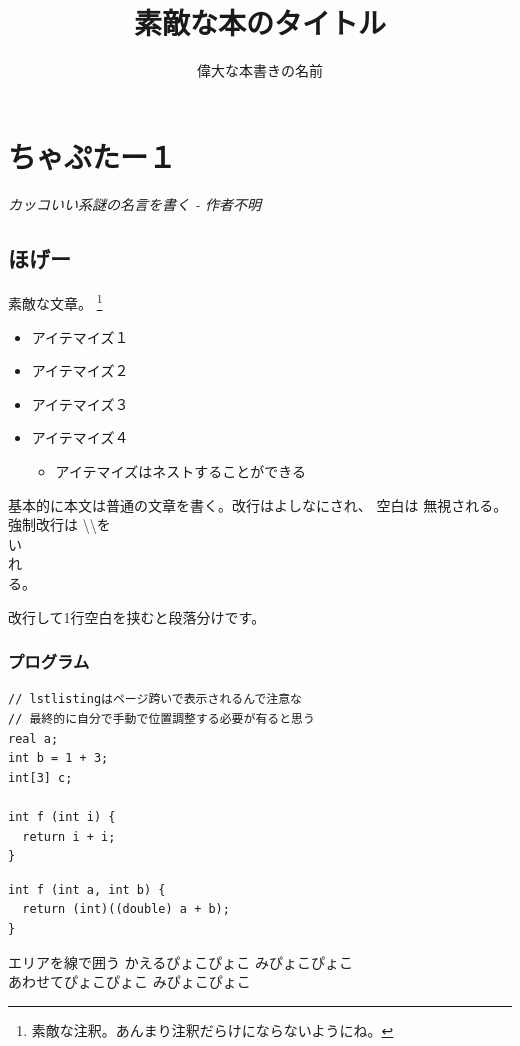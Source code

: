 \documentclass[9pt,b5paper,dvipdfmx,openany]{jsbook}
\title{素敵な本のタイトル}
\author{偉大な本書きの名前}
\begin{document}
\maketitle
\tableofcontents

\chapter{ちゃぷたー１}
\begin{flushright}
  \it カッコいい系謎の名言を書く - 作者不明 \\
\end{flushright}

\section{ほげー}

素敵な文章。
\footnote{素敵な注釈。あんまり注釈だらけにならないようにね。}

\begin{itemize}
\item アイテマイズ１
\item アイテマイズ２
\item アイテマイズ３
\item アイテマイズ４
  \begin{itemize}
   \item アイテマイズはネストすることができる
  \end{itemize}
\end{itemize}

基本的に本文は普通の文章を書く。改行はよしなにされ、 空白は  無視される。
強制改行は \textbackslash\textbackslash を \\
い \\
れ \\
る。

改行して1行空白を挟むと段落分けです。 %


\subsection{プログラム}
\begin{lstlisting}
// lstlistingはページ跨いで表示されるんで注意な
// 最終的に自分で手動で位置調整する必要が有ると思う
real a;
int b = 1 + 3;
int[3] c;

int f (int i) {
  return i + i;
}
\end{lstlisting}

\begin{minipage}[t]{0.5\linewidth}
\begin{lstlisting}[caption=プログラム]
int f (int a, int b) {
  return (int)((double) a + b);
}
\end{lstlisting}
\end{minipage}
\begin{minipage}[t]{0.5\linewidth}
\begin{itembox}[l]{エリアを線で囲う}
  \centering
  かえるぴょこぴょこ みぴょこぴょこ \\
  あわせてぴょこぴょこ みぴょこぴょこ
\end{itembox}
\end{minipage}
\end{document}
